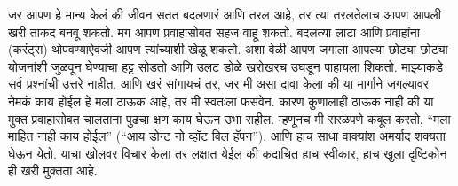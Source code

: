 जर आपण हे मान्य केलं की जीवन सतत बदलणारं आणि तरल आहे, तर त्या तरलतेलाच आपण आपली खरी ताकद बनवू शकतो. मग आपण प्रवाहासोबत सहज वाहू शकतो. बदलत्या लाटा आणि प्रवाहांना (करंट्स) थोपवण्याऐवजी आपण त्यांच्याशी खेळू शकतो. अशा वेळी आपण जगाला आपल्या छोट्या छोट्या योजनांशी जुळवून घेण्याचा हट्ट सोडतो आणि उलट डोळे खरोखरच उघडून पाहायला शिकतो.
माझ्याकडे सर्व प्रश्नांची उत्तरे नाहीत. आणि खरं सांगायचं तर, जर मी असा दावा केला की या मार्गाने जगल्यावर नेमकं काय होईल हे मला ठाऊक आहे, तर मी स्वतःला फसवेन. कारण कुणालाही ठाऊक नाही की या मुक्त प्रवाहासोबत चालताना पुढचा क्षण काय घेऊन उभा राहील.
म्हणूनच मी सरळपणे कबूल करतो,  “मला माहित नाही काय होईल” (“आय डोन्ट नो व्हॉट विल हॅपन”). आणि हाच साधा वाक्यांश अमर्याद शक्यता घेऊन येतो. याचा खोलवर विचार केला तर लक्षात येईल की कदाचित हाच स्वीकार, हाच खुला दृष्टिकोन ही खरी मुक्तता आहे.

